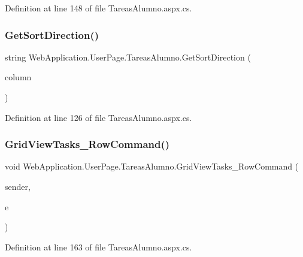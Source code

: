 Definition at line 148 of file Tareas\+Alumno.\+aspx.\+cs.

\mbox{\label{classWebApplication_1_1UserPage_1_1TareasAlumno_a7907c4d40a61f3a8c7390f7e1ad27219}} 
\subsubsection{\texorpdfstring{GetSortDirection()}{GetSortDirection()}}
{\footnotesize\ttfamily string Web\+Application.\+User\+Page.\+Tareas\+Alumno.\+Get\+Sort\+Direction (\begin{DoxyParamCaption}\item[{string}]{column }\end{DoxyParamCaption})\hspace{0.3cm}{\ttfamily [private]}}



Definition at line 126 of file Tareas\+Alumno.\+aspx.\+cs.

\mbox{\label{classWebApplication_1_1UserPage_1_1TareasAlumno_a1ec6db1595f25c6e457c8614c1cee735}} 
\subsubsection{\texorpdfstring{GridViewTasks\_RowCommand()}{GridViewTasks\_RowCommand()}}
{\footnotesize\ttfamily void Web\+Application.\+User\+Page.\+Tareas\+Alumno.\+Grid\+View\+Tasks\+\_\+\+Row\+Command (\begin{DoxyParamCaption}\item[{object}]{sender,  }\item[{Grid\+View\+Command\+Event\+Args}]{e }\end{DoxyParamCaption})\hspace{0.3cm}{\ttfamily [protected]}}



Definition at line 163 of file Tareas\+Alumno.\+aspx.\+cs.


